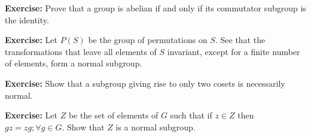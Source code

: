 \textbf{Exercise:} Prove that a group is abelian if and only if its commutator subgroup is the identity.

\textbf{Exercise:} Let $P(S)$ be the group of permutations on $S$. See that the transformations that leave all elements of $S$ invariant, except for a finite number of elements, form a normal subgroup.

\textbf{Exercise:} Show that a subgroup giving rise to only two cosets is necessarily normal.

\textbf{Exercise:} Let $Z$ be the set of elements of $G$ such that if $z \in Z$ then $gz=zg ; \forall g \in G$. Show that $Z$ is a normal subgroup.

